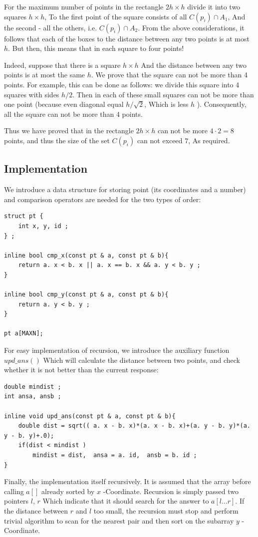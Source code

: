 For the maximum number of points in the rectangle $2h \times h$ divide it into two squares $h \times h$, To the first point of the square consists of all $C (p_i) \cap A_1$, And the second - all the others, i.e. $C (p_i) \cap A_2$. From the above considerations, it follows that each of the boxes to the distance between any two points is at most $h$. But then, this means that in each square to four points!

Indeed, suppose that there is a square $h \times h$ And the distance between any two points is at most the same $h$. We prove that the square can not be more than 4 points. For example, this can be done as follows: we divide this square into 4 squares with sides $h / 2$. Then in each of these small squares can not be more than one point (because even diagonal equal $h / \sqrt {2}$, Which is less $h$ ). Consequently, all the square can not be more than 4 points.

Thus we have proved that in the rectangle $2h \times h$ can not be more $4 \cdot 2 = 8$ points, and thus the size of the set $C (p_i)$ can not exceed $7$, As required.

\subsection{ Implementation }

We introduce a data structure for storing point (its coordinates and a number) and comparison operators are needed for the two types of order:

\begin{verbatim}
struct pt {
    int x, y, id ;
} ;
 
inline bool cmp_x(const pt & a, const pt & b){
    return a. x < b. x || a. x == b. x && a. y < b. y ;
}
 
inline bool cmp_y(const pt & a, const pt & b){
    return a. y < b. y ;
}
 
pt a[MAXN]; 
\end{verbatim}
For easy implementation of recursion, we introduce the auxiliary function $upd \_ans()$ Which will calculate the distance between two points, and check whether it is not better than the current response:

\begin{verbatim}
double mindist ;
int ansa, ansb ;
 
inline void upd_ans(const pt & a, const pt & b){
    double dist = sqrt(( a. x - b. x)*(a. x - b. x)+(a. y - b. y)*(a. y - b. y)+.0);
    if(dist < mindist )
        mindist = dist,  ansa = a. id,  ansb = b. id ;
} 
\end{verbatim}
Finally, the implementation itself recursively. It is assumed that the array before calling $a []$ already sorted by $x$ -Coordinate. Recursion is simply passed two pointers $l$, $r$ Which indicate that it should search for the answer to $a [l \ldots r]$. If the distance between $r$ and $l$ too small, the recursion must stop and perform trivial algorithm to scan for the nearest pair and then sort on the subarray $y$ -Coordinate.

